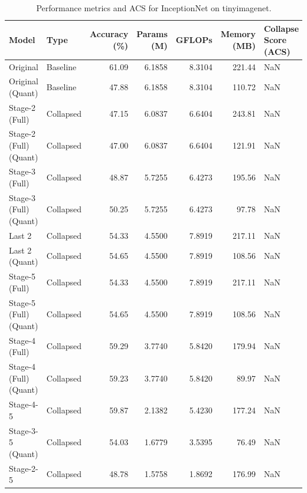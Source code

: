 \begin{table}
\caption{Performance metrics and ACS for InceptionNet on tinyimagenet.}
\label{tab:InceptionNet_tinyimagenet}
\begin{tabular}{llrrrrl}
\toprule
Model & Type & Accuracy (\%) & Params (M) & GFLOPs & Memory (MB) & Collapse Score (ACS) \\
\midrule
Original & Baseline & 61.09 & 6.1858 & 8.3104 & 221.44 & NaN \\
Original
(Quant) & Baseline & 47.88 & 6.1858 & 8.3104 & 110.72 & NaN \\
Stage-2 (Full) & Collapsed & 47.15 & 6.0837 & 6.6404 & 243.81 & NaN \\
Stage-2 (Full)
(Quant) & Collapsed & 47.00 & 6.0837 & 6.6404 & 121.91 & NaN \\
Stage-3 (Full) & Collapsed & 48.87 & 5.7255 & 6.4273 & 195.56 & NaN \\
Stage-3 (Full)
(Quant) & Collapsed & 50.25 & 5.7255 & 6.4273 & 97.78 & NaN \\
Last 2 & Collapsed & 54.33 & 4.5500 & 7.8919 & 217.11 & NaN \\
Last 2
(Quant) & Collapsed & 54.65 & 4.5500 & 7.8919 & 108.56 & NaN \\
Stage-5 (Full) & Collapsed & 54.33 & 4.5500 & 7.8919 & 217.11 & NaN \\
Stage-5 (Full)
(Quant) & Collapsed & 54.65 & 4.5500 & 7.8919 & 108.56 & NaN \\
Stage-4 (Full) & Collapsed & 59.29 & 3.7740 & 5.8420 & 179.94 & NaN \\
Stage-4 (Full)
(Quant) & Collapsed & 59.23 & 3.7740 & 5.8420 & 89.97 & NaN \\
Stage-4-5 & Collapsed & 59.87 & 2.1382 & 5.4230 & 177.24 & NaN \\
Stage-3-5
(Quant) & Collapsed & 54.03 & 1.6779 & 3.5395 & 76.49 & NaN \\
Stage-2-5 & Collapsed & 48.78 & 1.5758 & 1.8692 & 176.99 & NaN \\
\bottomrule
\end{tabular}
\end{table}
